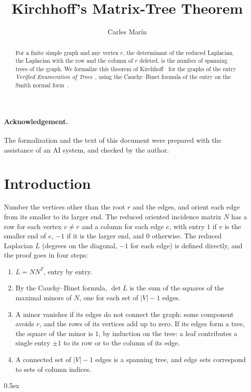 \documentclass[10pt,a4paper]{article}
\begin{document}
\title{Kirchhoff's Matrix-Tree Theorem}
\author{Carles Mar\'in}
\maketitle

\begin{abstract}
For a finite simple graph and any vertex $r$, the determinant of the reduced Laplacian, the Laplacian with the row
and the column of $r$ deleted, is the number of spanning trees of the graph. We formalize this theorem of
Kirchhoff~\cite{Kirchhoff1847} for the graphs of the entry \emph{Verified Enumeration of Trees}~\cite{AFP-Trees},
using the Cauchy--Binet formula of the entry on the Smith normal form~\cite{AFP-SNF}.
\end{abstract}

\paragraph{Acknowledgement.} The formalization and the text of this document were prepared with the
assistance of an AI system, and checked by the author.

\tableofcontents

\section*{Introduction}

Number the vertices other than the root $r$ and the edges, and orient each edge from its smaller to its larger end.
The reduced oriented incidence matrix $N$ has a row for each vertex $v \neq r$ and a column for each edge $e$, with
entry $1$ if $v$ is the smaller end of $e$, $-1$ if it is the larger end, and $0$ otherwise. The reduced Laplacian
$L$ (degrees on the diagonal, $-1$ for each edge) is defined directly, and the proof goes in four steps:
\begin{enumerate}
\item $L = N N^{T}$, entry by entry.
\item By the Cauchy--Binet formula, $\det L$ is the sum of the squares of the maximal minors of $N$, one for each
  set of $|V| - 1$ edges.
\item A minor vanishes if its edges do not connect the graph: some component avoids $r$, and the rows of its
  vertices add up to zero. If its edges form a tree, the square of the minor is $1$, by induction on the tree: a
  leaf contributes a single entry $\pm 1$ to its row or to the column of its edge.
\item A connected set of $|V| - 1$ edges is a spanning tree, and edge sets correspond to sets of column indices.
\end{enumerate}

\parindent 0pt\parskip 0.5ex





\end{document}
